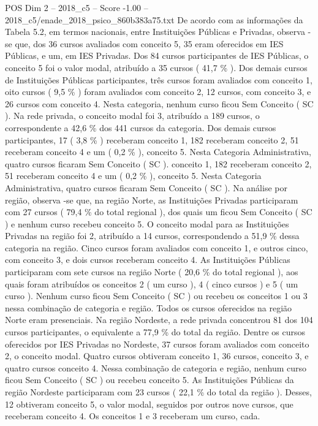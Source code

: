 \begin{textsample}{POS Dim 2 – 2018\_c5 – Score -1.00 – 2018\_c5/enade\_2018\_psico\_860b383a75.txt}
De acordo com as informações da Tabela 5.2, em termos nacionais, entre Instituições Públicas e Privadas, observa -se que, dos 36 cursos avaliados com conceito 5, 35 eram oferecidos em IES Públicas, e um, em IES Privadas.
Dos 84 cursos participantes de IES Públicas, o conceito 5 foi o valor modal, atribuído a 35 cursos ( 41,7 \% ).
Dos demais cursos de Instituições Públicas participantes, três cursos foram avaliados com conceito 1, oito cursos ( 9,5 \% ) foram avaliados com conceito 2, 12 cursos, com conceito 3, e 26 cursos com conceito 4.
Nesta categoria, nenhum curso ficou Sem Conceito ( SC ).
Na rede privada, o conceito modal foi 3, atribuído a 189 cursos, o correspondente a 42,6 \% dos 441 cursos da categoria.
Dos demais cursos participantes, 17 ( 3,8 \% ) receberam conceito 1, 182 receberam conceito 2, 51 receberam conceito 4 e um ( 0,2 \% ), conceito 5.
Nesta Categoria Administrativa, quatro cursos ficaram Sem Conceito ( SC ). conceito 1, 182 receberam conceito 2, 51 receberam conceito 4 e um ( 0,2 \% ), conceito 5.
Nesta Categoria Administrativa, quatro cursos ficaram Sem Conceito ( SC ).
Na análise por região, observa -se que, na região Norte, as Instituições Privadas participaram com 27 cursos ( 79,4 \% do total regional ), dos quais um ficou Sem Conceito ( SC ) e nenhum curso recebeu conceito 5.
O conceito modal para as Instituições Privadas na região foi 2, atribuído a 14 cursos, correspondendo a 51,9 \% dessa categoria na região.
Cinco cursos foram avaliados com conceito 1, e outros cinco, com conceito 3, e dois cursos receberam conceito 4.
As Instituições Públicas participaram com sete cursos na região Norte ( 20,6 \% do total regional ), aos quais foram atribuídos os conceitos 2 ( um curso ), 4 ( cinco cursos ) e 5 ( um curso ).
Nenhum curso ficou Sem Conceito ( SC ) ou recebeu os conceitos 1 ou 3 nessa combinação de categoria e região.
Todos os cursos oferecidos na região Norte eram presenciais.
Na região Nordeste, a rede privada concentrou 81 dos 104 cursos participantes, o equivalente a 77,9 \% do total da região.
Dentre os cursos oferecidos por IES Privadas no Nordeste, 37 cursos foram avaliados com conceito 2, o conceito modal.
Quatro cursos obtiveram conceito 1, 36 cursos, conceito 3, e quatro cursos conceito 4.
Nessa combinação de categoria e região, nenhum curso ficou Sem Conceito ( SC ) ou recebeu conceito 5.
As Instituições Públicas da região Nordeste participaram com 23 cursos ( 22,1 \% do total da região ).
Desses, 12 obtiveram conceito 5, o valor modal, seguidos por outros nove cursos, que receberam conceito 4.
Os conceitos 1 e 3 receberam um curso, cada.

\end{textsample}
